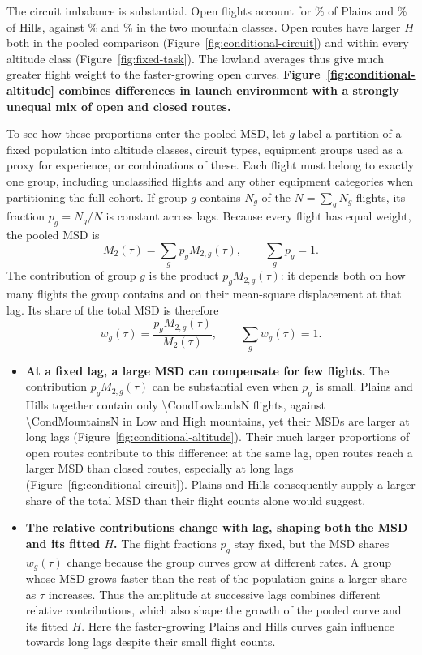 The circuit imbalance is substantial. Open flights
account for \ChThreeConditionalPlainsOpenPct\% of Plains and
\ChThreeConditionalHillsOpenPct\% of Hills, against
\ChThreeConditionalLowMountainsOpenPct\% and
\ChThreeConditionalHighMountainsOpenPct\% in the two mountain classes.
Open routes have larger $H$ both in the pooled comparison
(Figure~\ref{fig:conditional-circuit}) and within every altitude class
(Figure~\ref{fig:fixed-task}). The lowland averages thus give much greater
flight weight to the faster-growing open curves.
\textbf{Figure~\ref{fig:conditional-altitude} combines differences in launch
environment with a strongly unequal mix of open and closed routes.}

To see how these proportions enter the pooled MSD, let $g$ label a partition
of a fixed population into altitude classes, circuit types, equipment groups
used as a proxy for experience, or combinations of these. Each flight must belong to exactly one
group, including unclassified flights and any other equipment categories when
partitioning the full cohort. If group $g$ contains $N_g$ of the
$N=\sum_g N_g$ flights, its fraction $p_g=N_g/N$ is constant across lags.
Because every flight has equal weight, the pooled MSD is
\begin{equation}
 M_2(\tau)=\sum_g p_g M_{2,g}(\tau),
 \qquad \sum_g p_g=1.
 \label{eq:fixed-mixture}
\end{equation}
The contribution of group $g$ is the product $p_gM_{2,g}(\tau)$: it depends
both on how many flights the group contains and on their mean-square
displacement at that lag. Its share of the total MSD is therefore
\begin{equation}
 w_g(\tau)=\frac{p_gM_{2,g}(\tau)}{M_2(\tau)},
 \qquad \sum_g w_g(\tau)=1.
 \label{eq:fixed-msd-share}
\end{equation}
\begin{itemize}
 \item \textbf{At a fixed lag, a large MSD can compensate for few flights.}
 The contribution $p_gM_{2,g}(\tau)$ can be substantial even when $p_g$ is
 small. Plains and Hills together contain only \num{\CondLowlandsN} flights,
 against \num{\CondMountainsN} in Low and High mountains, yet their MSDs are
 larger at long lags (Figure~\ref{fig:conditional-altitude}). Their much larger
 proportions of open routes contribute to this difference: at the same lag,
 open routes reach a larger MSD than closed routes, especially at long lags
 (Figure~\ref{fig:conditional-circuit}). Plains and Hills consequently supply
 a larger share of the total MSD than their flight counts alone would suggest.

 \item \textbf{The relative contributions change with lag, shaping both the
 MSD and its fitted $H$.}
 The flight fractions $p_g$ stay fixed, but the MSD shares $w_g(\tau)$ change
 because the group curves grow at different rates. A group whose MSD grows
 faster than the rest of the population gains a larger share as $\tau$
 increases. Thus the amplitude at successive lags combines different relative
 contributions, which also shape the growth of the pooled curve and its
 fitted $H$. Here the faster-growing Plains and Hills curves gain influence
 towards long lags despite their small flight counts.
\end{itemize}
